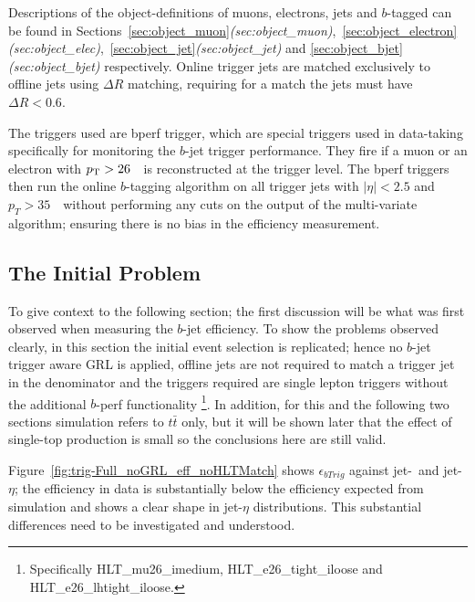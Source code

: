 Descriptions of the object-definitions of muons, electrons, jets and $b$-tagged can be found in
Sections~\ref{sec:object_muon}\textit{(sec:object\_muon)},~\ref{sec:object_electron}\textit{(sec:object\_elec)},~\ref{sec:object_jet}\textit{(sec:object\_jet)}
and \ref{sec:object_bjet}\textit{(sec:object\_bjet)} respectively.
Online trigger jets are matched exclusively to offline jets using $\Delta R$ matching, requiring for a match the jets must have $\Delta R<0.6$.

The triggers used are bperf trigger, which are special triggers used in data-taking specifically for monitoring the $b$-jet trigger performance.
They fire if a muon or an electron with $p_{\mathrm{T}} > 26$~\GeV~is reconstructed at the trigger level.
The bperf triggers then run the online $b$-tagging algorithm on all trigger jets with $|\eta|<2.5$ and
$p_{T}>35$~\GeV~without performing any cuts on the output of the multi-variate algorithm; ensuring there is no bias in the efficiency measurement. 


\newpage

\subsection{The Initial Problem}
\label{sec:trig-initProb}

To give context to the following section;
the first discussion will be what was first observed when measuring the $b$-jet efficiency.
To show the problems observed clearly, in this section the initial event selection is replicated;
hence  no $b$-jet trigger aware GRL is applied, offline jets are not required to match a trigger jet in the denominator
and the triggers required are single lepton triggers without the additional $b$-perf functionality
\footnote{Specifically HLT\_mu26\_imedium, HLT\_e26\_tight\_iloose and HLT\_e26\_lhtight\_iloose. }.
In addition, for this and the following two sections simulation refers to $t\bar{t}$ only,
but it will be shown later that the effect of single-top production is small so the conclusions here are still valid. 

Figure~\ref{fig:trig-Full_noGRL_eff_noHLTMatch} shows $\epsilon_{bTrig}$ against jet-\pT~and jet-$\eta$;
the efficiency in data is substantially below the efficiency expected from simulation and shows a clear shape in jet-$\eta$ distributions.
This substantial differences need to be investigated and understood. 

